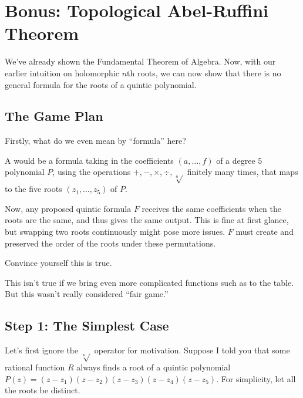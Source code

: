 \chapter{Bonus: Topological Abel-Ruffini Theorem}

We've already shown the Fundamental Theorem of Algebra.
Now, with our earlier intuition on holomorphic $n$th roots,
we can now show that there is no general formula for 
the roots of a quintic polynomial.

\section{The Game Plan}

Firstly, what do we even mean by ``formula'' here?

\begin{definition}
    A  would be a formula taking in the coefficients $(a, \dots, f)$ of a 
    degree $5$ polynomial $P$, using the operations $+, -, \times, \div, \sqrt[n]{}$ 
    finitely many times, that maps to the five roots $(z_1, \dots, z_5)$ of $P$.
\end{definition}

Now, any proposed quintic formula $F$ receives the same coefficients when the roots are the same,
and thus gives the same output. This is fine at first glance, but swapping two roots continuously 
might pose more issues. $F$ must create and preserved the order of the roots under these permutations.

\begin{ques}
    Convince yourself this is true.
\end{ques}

\begin{remark}
    This isn't true if we bring even more complicated functions 
    such as  to the table. 
    But this wasn't really considered ``fair game.''
\end{remark}

\section{Step 1: The Simplest Case}

Let's first ignore the $\sqrt[n]{}$ operator for motivation.
Suppose I told you that some rational function $R$ always finds 
a root of a quintic polynomial $P(z) = (z - z_1)(z - z_2)(z - z_3)(z - z_4)(z - z_5)$.
For simplicity, let all the roots be distinct.


